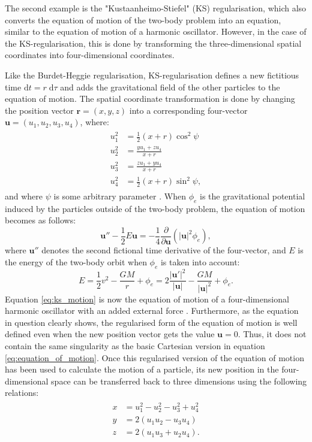\documentclass[english, twoside]{HYgradu}
\begin{document}
The second example is the "Kustaanheimo-Stiefel" (KS) regularisation, which also converts the equation of motion of the two-body problem into an equation, similar to the equation of motion of a harmonic oscillator. However, in the case of the KS-regularisation, this is done by transforming the three-dimensional spatial coordinates into four-dimensional coordinates. 

Like the Burdet-Heggie regularisation, KS-regularisation defines a new fictitious time $\mathrm{d}t = r \; \mathrm{d}\tau$ and adds the gravitational field of the other particles to the equation of motion. The spatial coordinate transformation is done by changing the position vector $\mathbf{r} = (x, y, z)$ into a corresponding four-vector $\mathbf{u} = (u_1, u_2, u_3, u_4)$, where:
\begin{align}
\begin{split}
u_1^2& = \frac{1}{2}(x+r)\cos^2\psi \\
u_2^2& = \frac{yu_1+zu_4}{x+r} \\
u_3^2& = \frac{zu_1+yu_4}{x+r} \\
u_4^2& = \frac{1}{2}(x+r)\sin^2\psi,
\end{split}
\end{align}
and where $\psi$ is some arbitrary parameter \citep{BinneyTremaine}. When $\phi_e$ is the gravitational potential induced by the particles outside of the two-body problem, the equation of motion becomes as follows:
\begin{equation}
\mathbf{u}'' - \frac{1}{2} E \mathbf{u} = -\frac{1}{4} \frac{\partial}{\partial\mathbf{u}} \left( |\mathbf{u}|^2 \phi_e \right), \label{eq:ks_motion}
\end{equation} 
where $\mathbf{u}''$ denotes the second fictional time derivative of the four-vector, and $E$ is the energy of the two-body orbit when $\phi_e$ is taken into account:
\begin{equation}
E = \frac{1}{2}v^2 - \frac{GM}{r} + \phi_e = 2 \frac{|\mathbf{u'}|^2}{|\mathbf{u}|} - \frac{GM}{|\mathbf{u}|^2} + \phi_e.
\end{equation}
Equation \ref{eq:ks_motion} is now the equation of motion of a four-dimensional harmonic oscillator with an added external force \citep{BinneyTremaine}. Furthermore, as the equation in question clearly shows, the regularised form of the equation of motion is well defined even when the new position vector gets the value $\mathbf{u} = 0$. Thus, it does not contain the same singularity as the basic Cartesian version in equation \ref{eq:equation_of_motion}. Once this regularised version of the equation of motion has been used to calculate the motion of a particle, its new position in the four-dimensional space can be transferred back to three dimensions using the following relations:
\begin{align}
\begin{split}
x &= u_1^2 - u_2^2 - u_3^2 + u_4^2 \\
y &= 2 \left( u_1 u_2 - u_3 u_4 \right) \\
z &= 2 \left( u_1 u_3 + u_2 u_4 \right).
\end{split}
\end{align}
\end{document}
